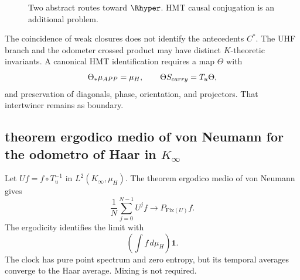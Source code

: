 \begin{figure}[H]
\centering
{}
\caption{Two abstract routes toward \(\Rhyper\). HMT causal conjugation
is an additional problem.}
\label{p12-83-c21-s3:fig:two-routes-r}
\end{figure}

The coincidence of weak closures does not identify the antecedents
\(C^*\). The UHF branch and the odometer crossed product may have
distinct \(K\)-theoretic invariants. A canonical HMT identification requires
a map \(\Theta\) with
\[
  \Theta_*\mu_{\APP}=\mu_H,
  \qquad
  \Theta S_{\rm carry}=T_u\Theta,
\]
and preservation of diagonals, phase, orientation, and projectors. That
intertwiner remains as boundary.

\subsection{theorem ergodico medio of von Neumann for the odometro of Haar in \(K_\infty\)}

Let \(U f=f\circ T_u^{-1}\) in \(L^2(K_\infty,\mu_H)\). The theorem
ergodico medio of von Neumann \citep{vonneumann1932ergodic} gives
\[
 \frac1N\sum_{j=0}^{N-1}U^jf
 \longrightarrow
 P_{\mathrm{Fix}(U)}f.
\]
The ergodicity identifies the limit with
\[
  \left(\int f\,d\mu_H\right)\mathbf1.
\]
The clock has pure point spectrum and zero entropy, but its temporal
averages converge to the Haar average. Mixing is not required.

